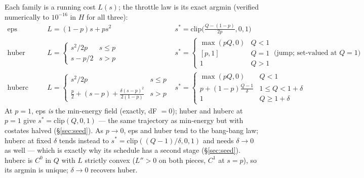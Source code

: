 \documentclass[11pt]{article}
\begin{document}
\begin{rig}
Each family is a running cost $L(s)$; the throttle law is its exact argmin
(verified numerically to $10^{-16}$ in $H$ for all three):
\[
\begin{array}{lll}
\text{eps (Bertrand--Epenoy)} & L=(1-p)s+ps^2 & s^*=\mathrm{clip}\big(\tfrac{Q-(1-p)}{2p},0,1\big)\\[2pt]
\text{huber (PLQ)} & L=\begin{cases}s^2/2p & s\le p\\ s-p/2 & s>p\end{cases} & s^*=\begin{cases}\max(pQ,0)&Q<1\\ [p,1]&Q=1\\ 1&Q>1\end{cases}\ \text{(jump; set-valued at }Q=1)\\[8pt]
\text{huberc (hybrid)} & L=\begin{cases}s^2/2p & s\le p\\ \tfrac p2+(s-p)+\tfrac{\delta(s-p)^2}{2(1-p)} & s>p\end{cases} & s^*=\begin{cases}\max(pQ,0)&Q<1\\ p+(1-p)\tfrac{Q-1}{\delta}&1\le Q<1+\delta\\ 1&Q\ge1+\delta\end{cases}
\end{array}
\]
At $p=1$, eps \emph{is} the min-energy field (exactly, dF $=0$); huber and
huberc at $p=1$ give $s^*=\mathrm{clip}(Q,0,1)$ --- the same trajectory as
min-energy but with costates halved (\S\ref{sec:seed}). As $p\to0$, eps and huber tend to the bang-bang law; huberc at fixed $\delta$ tends instead to $s^*=\mathrm{clip}((Q-1)/\delta,0,1)$ and needs $\delta\to0$ as well --- which is exactly why its schedule has a second stage (\S\ref{sec:seed}). huberc is $C^0$ in $Q$ with $L$ strictly convex
($L''>0$ on both pieces, $C^1$ at $s=p$), so its argmin is unique; $\delta\to0$
recovers huber.
\end{rig}
\end{document}
